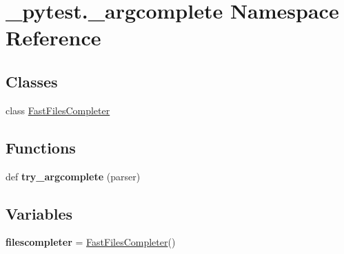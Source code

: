 \hypertarget{namespace__pytest_1_1__argcomplete}{}\section{\+\_\+pytest.\+\_\+argcomplete Namespace Reference}
\label{namespace__pytest_1_1__argcomplete}
\subsection*{Classes}
\begin{DoxyCompactItemize}
\item 
class \hyperlink{class__pytest_1_1__argcomplete_1_1_fast_files_completer}{Fast\+Files\+Completer}
\end{DoxyCompactItemize}
\subsection*{Functions}
\begin{DoxyCompactItemize}
\item 
\mbox{\label{namespace__pytest_1_1__argcomplete_abd07c223377149b789ee926e80aed5d9}} 
def {\bfseries try\+\_\+argcomplete} (parser)
\end{DoxyCompactItemize}
\subsection*{Variables}
\begin{DoxyCompactItemize}
\item 
\mbox{\label{namespace__pytest_1_1__argcomplete_aa50b6bcac999d07ffa8d0d61a192cfe5}} 
{\bfseries filescompleter} = \hyperlink{class__pytest_1_1__argcomplete_1_1_fast_files_completer}{Fast\+Files\+Completer}()
\end{DoxyCompactItemize}


